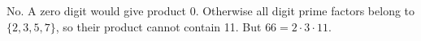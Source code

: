 No. A zero digit would give product 0. Otherwise all digit prime factors belong to $\{2,3,5,7\}$, so their product cannot contain 11. But $66=2\cdot3\cdot11$.
